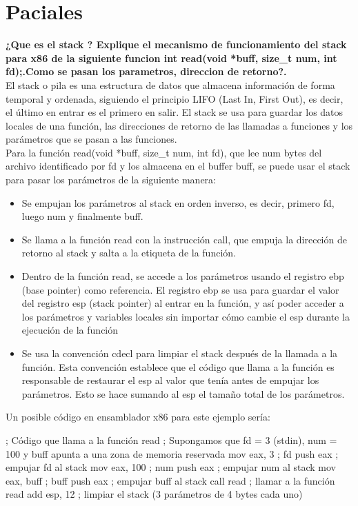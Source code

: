 \documentclass[../main.tex]{subfiles}
\begin{document}

\section{Paciales}
\textbf{¿Que es el stack ? Explique el mecanismo de funcionamiento del stack para x86 de la siguiente funcion int read(void *buff, size\_t num, int fd);.Como se pasan los parametros, direccion de retorno?.}\\

El stack o pila es una estructura de datos que almacena información de forma temporal y ordenada, siguiendo el principio LIFO (Last In, First Out), es decir, el último en entrar es el primero en salir. El stack se usa para guardar los datos locales de una función, las direcciones de retorno de las llamadas a funciones y los parámetros que se pasan a las funciones.\\

Para la función read(void *buff, size\_t num, int fd), que lee num bytes del archivo identificado por fd y los almacena en el buffer buff, se puede usar el stack para pasar los parámetros de la siguiente manera:
\begin{itemize}
    \item Se empujan los parámetros al stack en orden inverso, es decir, primero fd, luego num y finalmente buff.
    \item Se llama a la función read con la instrucción call, que empuja la dirección de retorno al stack y salta a la etiqueta de la función.
    \item Dentro de la función read, se accede a los parámetros usando el registro ebp (base pointer) como referencia. El registro ebp se usa para guardar el valor del registro esp (stack pointer) al entrar en la función, y así poder acceder a los parámetros y variables locales sin importar cómo cambie el esp durante la ejecución de la función
    \item Se usa la convención cdecl para limpiar el stack después de la llamada a la función. Esta convención establece que el código que llama a la función es responsable de restaurar el esp al valor que tenía antes de empujar los parámetros. Esto se hace sumando al esp el tamaño total de los parámetros.
\end{itemize}

Un posible código en ensamblador x86 para este ejemplo sería:

; Código que llama a la función read ; Supongamos que fd = 3 (stdin), num = 100 y buff apunta a una zona de memoria reservada mov eax, 3 ; fd push eax ; empujar fd al stack mov eax, 100 ; num push eax ; empujar num al stack mov eax, buff ; buff push eax ; empujar buff al stack call read ; llamar a la función read add esp, 12 ; limpiar el stack (3 parámetros de 4 bytes cada uno)
\end{document}
